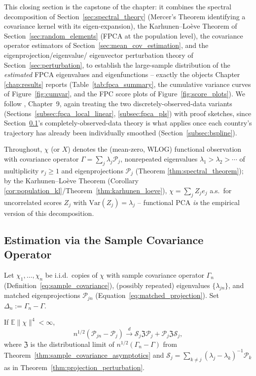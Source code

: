 This closing section is the capstone of the chapter: it combines the
spectral decomposition of Section~\ref{sec:spectral_theory} (Mercer's
Theorem identifying a covariance kernel with its eigen-expansion), the
Karhunen--Lo\`eve Theorem of Section~\ref{sec:random_elements} (FPCA at the
population level), the covariance operator estimators of
Section~\ref{sec:mean_cov_estimation}, and the eigenprojection/eigenvalue/
eigenvector perturbation theory of Section~\ref{sec:perturbation}, to
establish the large-sample distribution of the \emph{estimated} FPCA
eigenvalues and eigenfunctions -- exactly the objects Chapter
\ref{chap:results} reports (Table~\ref{tab:fpca_summary}, the cumulative
variance curves of Figure~\ref{fig:cumvar}, and the FPC score plots of
Figure~\ref{fig:score_plots}). We follow \cite{hsingeubank2015},
Chapter~9, again treating the two discretely-observed-data variants
(Sections~\ref{subsec:fpca_local_linear}, \ref{subsec:fpca_pls}) with proof
sketches, since Section~\ref{subsec:fpca_sample_covariance}'s
completely-observed-data theory is what applies once each country's
trajectory has already been individually smoothed
(Section~\ref{subsec:bspline}).

Throughout, $\chi$ (or $X$) denotes the (mean-zero, WLOG) functional
observation with covariance operator $\Gamma=\sum_j\lambda_j\mathcal{P}_j$,
nonrepeated eigenvalues $\lambda_1>\lambda_2>\cdots$ of multiplicity
$r_j\geq1$ and eigenprojections $\mathcal{P}_j$ (Theorem
\ref{thm:spectral_theorem}); by the Karhunen--Lo\`eve Theorem (Corollary
\ref{cor:population_kl}/Theorem~\ref{thm:karhunen_loeve}), $\chi=\sum_j
Z_je_j$ a.s.\ for uncorrelated scores $Z_j$ with $\mathrm{Var}(Z_j)=
\lambda_j$ -- functional PCA \emph{is} the empirical version of this
decomposition.

\subsection{Estimation via the Sample Covariance Operator}
\label{subsec:fpca_sample_covariance}

Let $\chi_1,\dots,\chi_n$ be i.i.d.\ copies of $\chi$ with sample
covariance operator $\Gamma_n$ (Definition~\eqref{eq:sample_covariance}),
(possibly repeated) eigenvalues $\{\lambda_{jn}\}$, and matched
eigenprojections $\mathcal{P}_{jn}$ (Equation~\eqref{eq:matched_projection}).
Set $\Delta_n:=\Gamma_n-\Gamma$.

\begin{theorem}
\label{thm:fpca_projection_clt}
If $\mathbb{E}\|\chi\|^4<\infty$,
\begin{equation}
n^{1/2}(\mathcal{P}_{jn}-\mathcal{P}_j) \xrightarrow{d} \mathcal{S}_j
\mathfrak{Z}\mathcal{P}_j+\mathcal{P}_j\mathfrak{Z}\mathcal{S}_j,
\label{eq:fpca_projection_clt}
\end{equation}
where $\mathfrak{Z}$ is the distributional limit of $n^{1/2}(\Gamma_n-
\Gamma)$ from Theorem~\ref{thm:sample_covariance_asymptotics} and
$\mathcal{S}_j=\sum_{k\neq j}(\lambda_j-\lambda_k)^{-1}\mathcal{P}_k$ as in
Theorem~\ref{thm:projection_perturbation}.
\end{theorem}

